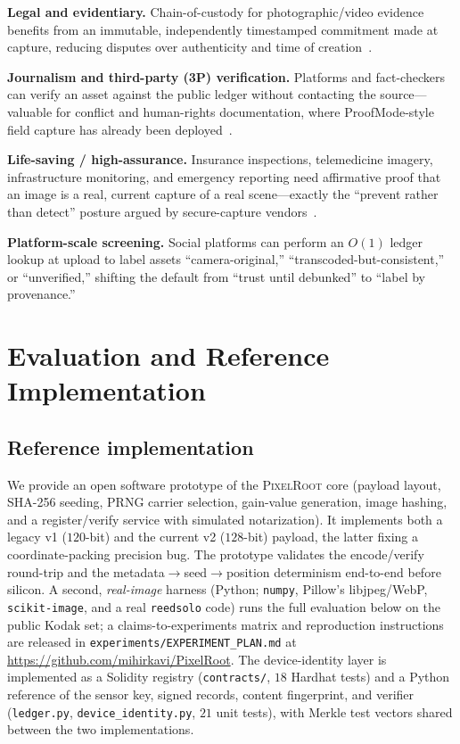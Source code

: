\documentclass[journal]{IEEEtran}
\newcommand{\pr}{\textup{\textsc{PixelRoot}}}
\begin{document}
\textbf{Legal and evidentiary.} Chain-of-custody for photographic/video evidence
benefits from an immutable, independently timestamped commitment made at
capture, reducing disputes over authenticity and time of
creation~\cite{korus2017digital}.

\textbf{Journalism and third-party (3P) verification.} Platforms and fact-checkers
can verify an asset against the public ledger without contacting the
source---valuable for conflict and human-rights documentation, where
ProofMode-style field capture has already been deployed~\cite{proofmode2023}.

\textbf{Life-saving / high-assurance.} Insurance inspections, telemedicine
imagery, infrastructure monitoring, and emergency reporting need affirmative
proof that an image is a real, current capture of a real scene---exactly the
``prevent rather than detect'' posture argued by secure-capture
vendors~\cite{truepic2024capture}.

\textbf{Platform-scale screening.} Social platforms can perform an
$O(1)$ ledger lookup at upload to label assets ``camera-original,''
``transcoded-but-consistent,'' or ``unverified,'' shifting the default from
``trust until debunked'' to ``label by provenance.''

\fi
\section{Evaluation and Reference Implementation}\label{sec:eval}

\subsection{Reference implementation}
We provide an open software prototype of the \pr{} core (payload layout, SHA-256
seeding, PRNG carrier selection, gain-value generation, image hashing, and a
register/verify service with simulated notarization). It implements both a
legacy \mbox{v1} ($120$-bit) and the current \mbox{v2} ($128$-bit) payload, the
latter fixing a coordinate-packing precision bug. The prototype validates the
encode/verify round-trip and the
metadata$\rightarrow$seed$\rightarrow$position determinism end-to-end before
silicon. A second, \emph{real-image} harness (Python; \texttt{numpy}, Pillow's
libjpeg/WebP, \texttt{scikit-image}, and a real \texttt{reedsolo} code) runs the
full evaluation below on the public Kodak set; a claims-to-experiments matrix and
reproduction instructions are released in \texttt{experiments/EXPERIMENT\_PLAN.md}
at \url{https://github.com/mihirkavi/PixelRoot}.
The device-identity layer is implemented as a Solidity registry
(\texttt{contracts/}, $18$ Hardhat tests) and a Python reference of the sensor
key, signed records, content fingerprint, and verifier (\texttt{ledger.py},
\texttt{device\_identity.py}, $21$ unit tests), with Merkle test vectors shared
between the two implementations.
\end{document}

